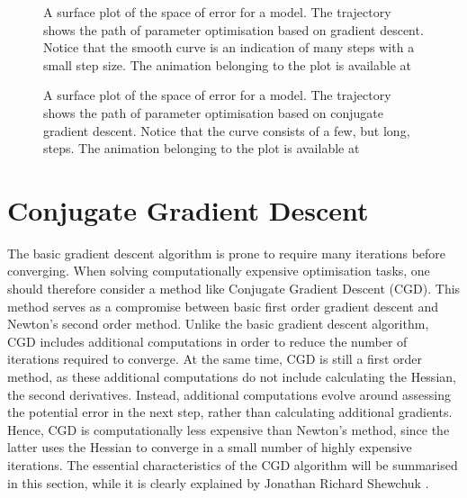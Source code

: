 \begin{figure}
    \centering
    
    \caption{A surface plot of the space of error for a model. The trajectory shows the path of parameter optimisation based on gradient descent.
        Notice that the smooth curve is an indication of many steps with a small step size. The animation belonging to the plot is available at %
    }
    \label{fig:GD_surface}
\end{figure}

\begin{figure}
    \centering
    
    \caption{A surface plot of the space of error for a model. The trajectory shows the path of parameter optimisation based on conjugate gradient descent.
        Notice that the curve consists of a few, but long, steps. The animation belonging to the plot is available at %
    }
    \label{fig:CGD_surface}
\end{figure}



\section{Conjugate Gradient Descent}\label{sec:theory_CGD}
\noindent
The basic gradient descent algorithm is prone to require many iterations before converging.
When solving computationally expensive optimisation tasks,
one should therefore consider a method like Conjugate Gradient Descent (CGD).
This method serves as a compromise between basic first order gradient descent and Newton's second order method.
Unlike the basic gradient descent algorithm, CGD includes additional computations in order to reduce the number of iterations required to converge.
At the same time, CGD is still a first order method, as these additional computations do not include calculating the Hessian, the second derivatives.
Instead, additional computations evolve around assessing the potential error in the next step, rather than calculating additional gradients.
Hence, CGD is computationally less expensive than Newton's method, since
the latter uses the Hessian to converge in a small number of highly expensive iterations.
The essential characteristics of the CGD algorithm will be summarised in this section, while it is clearly explained by Jonathan Richard Shewchuk \cite{shewchuk1994introduction}.


